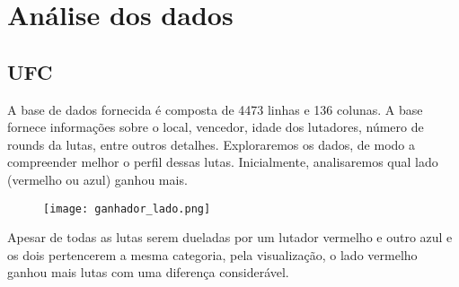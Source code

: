 \documentclass{article}
\begin{document}
\section{Análise dos dados}
\subsection{UFC}
A base de dados fornecida é composta de 4473 linhas e 136 colunas. A base fornece informações sobre o local, vencedor, idade dos lutadores, número de rounds da lutas, entre outros detalhes. Exploraremos os dados, de modo a compreender melhor o perfil dessas lutas. Inicialmente, analisaremos qual lado (vermelho ou azul) ganhou mais.

\begin{figure}[H] 
    \centering 
    \texttt{[image: ganhador\_lado.png]} 
\end{figure}

\par Apesar de todas as lutas serem dueladas por um lutador vermelho e outro azul e os dois pertencerem a mesma categoria, pela visualização, o lado vermelho ganhou mais lutas com uma diferença considerável.
\end{document}
